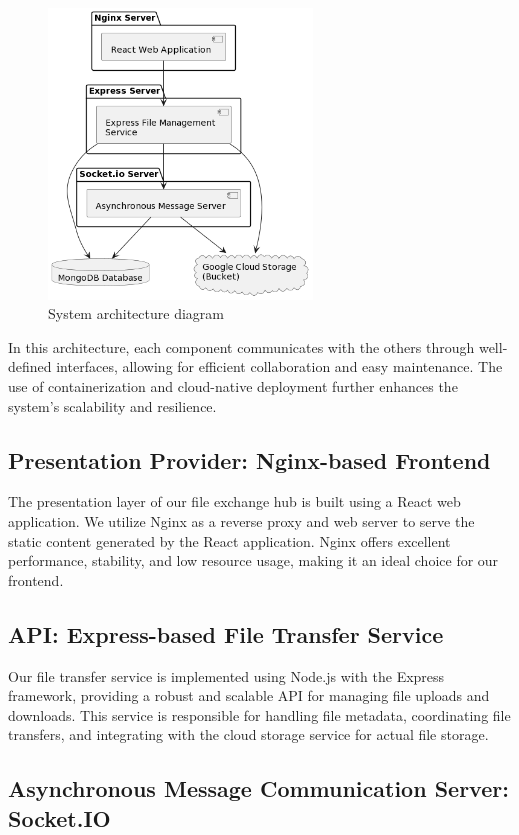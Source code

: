 \documentclass[a4paper,fleqn]{cas-dc}
\begin{document}
\begin{figure}[h]
    \centering
    \includegraphics[width=7cm]{architecture.png}
    \caption{System architecture diagram}
    \label{fig:architecture}
\end{figure}

In this architecture, each component communicates with the others through well-defined interfaces, allowing for efficient collaboration and easy maintenance. The use of containerization and cloud-native deployment further enhances the system's scalability and resilience.

\subsection{Presentation Provider: Nginx-based Frontend}

The presentation layer of our file exchange hub is built using a React web application. We utilize Nginx as a reverse proxy and web server to serve the static content generated by the React application. Nginx offers excellent performance, stability, and low resource usage, making it an ideal choice for our frontend.

\subsection{API: Express-based File Transfer Service}

Our file transfer service is implemented using Node.js with the Express framework, providing a robust and scalable API for managing file uploads and downloads. This service is responsible for handling file metadata, coordinating file transfers, and integrating with the cloud storage service for actual file storage.

\subsection{Asynchronous Message Communication Server: Socket.IO}
\end{document}

